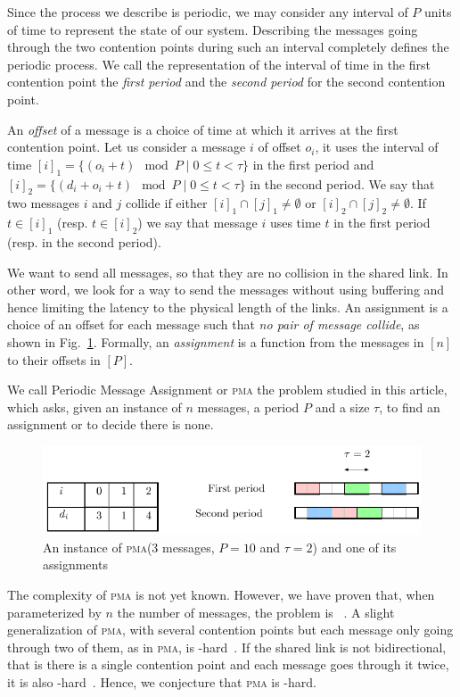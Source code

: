 \documentclass[10pt, conference, letterpaper]{IEEEtran}
\newcommand\pma{\textsc{pma}\xspace}
\begin{document}
Since the process we describe is periodic, we may consider any interval of $P$ units of time
to represent the state of our system. Describing the messages going through the two contention points during such an interval
completely defines the periodic process. We call the representation of the interval
of time in the first contention point the \emph{first period} and the \emph{second period}
for the second contention point.

An \emph{offset} of a message is a choice of time at which it arrives
at the first contention point. Let us consider a message $i$
of offset $o_i$, it uses the interval of time $[i]_1 = \{ (o_i + t) \mod P \mid 0 \leq t < \tau \}$ in the first period and $[i]_2 = \{ (d_i + o_i + t) \mod P \mid 0 \leq t < \tau \}$ in the second period. We say that two messages $i$ and $j$ collide if either $[i]_1 \cap [j]_1 \neq \emptyset $ or $[i]_2 \cap [j]_2 \neq \emptyset $. If $t \in [i]_1$ (resp. $t \in [i]_2$) we say that message $i$ uses time $t$ in the first period (resp. in the second period).

We want to send all messages, so that they are no collision in the shared link.
In other word, we look for a way to send the messages without using buffering and 
hence limiting the latency to the physical length of the links. An assignment is a
choice of an offset for each message such that \emph{no pair of message collide}, as shown in Fig.~\ref{fig:assignment}.
Formally, an \emph{assignment} is a function from the messages in $[n]$ to their offsets in $[P]$.  

We call Periodic Message Assignment or \pma the problem studied in this article,
which asks, given an instance of $n$ messages, a period $P$ and a size $\tau$, to find 
an assignment or to decide there is none.
\begin{figure}
\begin{center}
\includegraphics[scale=0.7]{instance}
\end{center}
\caption{An instance of \pma ($3$ messages, $P= 10$ and $\tau = 2$) and one of its assignments}
\label{fig:assignment}
\end{figure}

The complexity of \pma is not yet known. However, we have proven that, when parameterized by
$n$ the number of messages, the problem is \FPT~\cite{barth2018deterministic}.
A slight generalization of \pma, with several contention points but each message only going through two of them, as in \pma, is \NP-hard~\cite{barth2018deterministic}. If the shared link is not bidirectional, that is there is a single contention point and each message goes through it twice, it is also \NP-hard~\cite{orman1997complexity}. Hence, we conjecture that \pma is \NP-hard.
\end{document}
